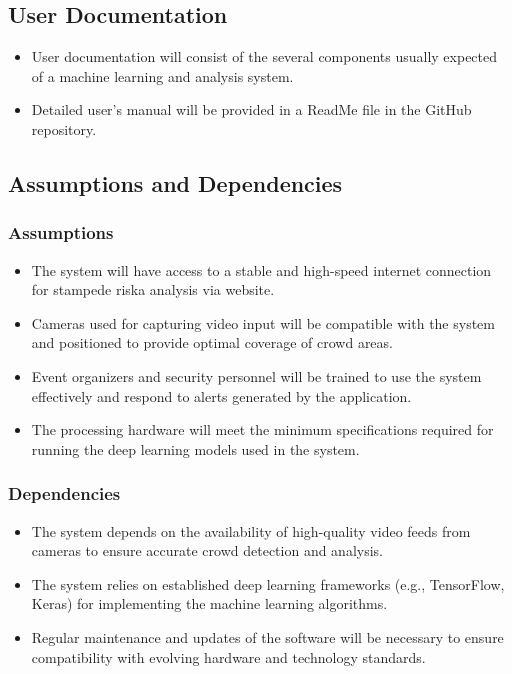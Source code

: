 \documentclass[11pt]{report}
\begin{document}
\subsection{User Documentation}
\begin{itemize}
    \item  User documentation will consist of the several components usually expected of a machine learning and analysis system.
     \item Detailed user’s manual will be provided in a ReadMe file in the GitHub repository.
\end{itemize}

\subsection{Assumptions and Dependencies}
\subsubsection{Assumptions}
\begin{itemize}
    \item The system will have access to a stable and high-speed internet connection for stampede riska analysis via website.
    \item Cameras used for capturing video input will be compatible with the system and positioned to provide optimal coverage of crowd areas.
    \item Event organizers and security personnel will be trained to use the system effectively and respond to alerts generated by the application.
    \item The processing hardware will meet the minimum specifications required for running the deep learning models used in the system.
\end{itemize}

\subsubsection{Dependencies}
\begin{itemize}
    \item The system depends on the availability of high-quality video feeds from cameras to ensure accurate crowd detection and analysis.
    \item The system relies on established deep learning frameworks (e.g., TensorFlow, Keras) for implementing the machine learning algorithms.
    \item Regular maintenance and updates of the software will be necessary to ensure compatibility with evolving hardware and technology standards.
\end{itemize}
        
\end{document}
